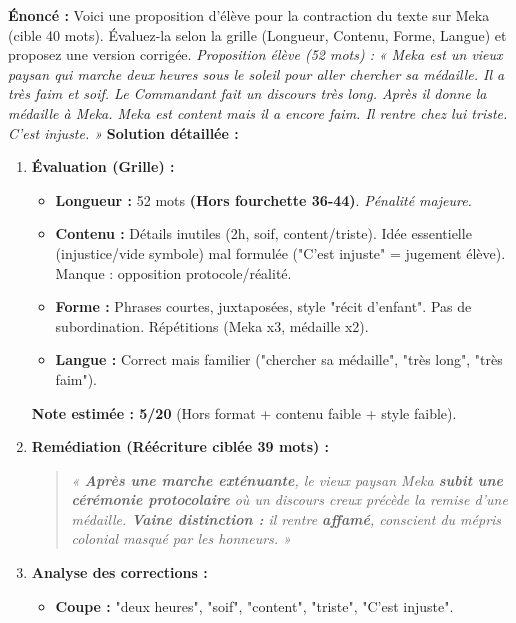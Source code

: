 \documentclass[11pt]{article}
\begin{document}
\begin{exoresolu}
    \textbf{Énoncé :} Voici une proposition d'élève pour la contraction du texte sur Meka (cible 40 mots). Évaluez-la selon la grille (Longueur, Contenu, Forme, Langue) et proposez une version corrigée.
    \textit{Proposition élève (52 mots) :}
    \textit{« Meka est un vieux paysan qui marche deux heures sous le soleil pour aller chercher sa médaille. Il a très faim et soif. Le Commandant fait un discours très long. Après il donne la médaille à Meka. Meka est content mais il a encore faim. Il rentre chez lui triste. C'est injuste. »}
    \tcblower
    \textbf{Solution détaillée :}
    \begin{enumerate}
        \item \textbf{Évaluation (Grille) :}
            \begin{itemize}
                \item \textbf{Longueur :} 52 mots \textbf{(Hors fourchette 36-44)}. \textit{Pénalité majeure.}
                \item \textbf{Contenu :} Détails inutiles (2h, soif, content/triste). Idée essentielle (injustice/vide symbole) mal formulée ("C'est injuste" = jugement élève). Manque : opposition protocole/réalité.
                \item \textbf{Forme :} Phrases courtes, juxtaposées, style "récit d'enfant". Pas de subordination. Répétitions (Meka x3, médaille x2).
                \item \textbf{Langue :} Correct mais familier ("chercher sa médaille", "très long", "très faim").
            \end{itemize}
            \textbf{Note estimée : 5/20} (Hors format + contenu faible + style faible).
        \item \textbf{Remédiation (Réécriture ciblée 39 mots) :}
            \begin{quote}
                \textit{« \textbf{Après une marche exténuante}, le vieux paysan Meka \textbf{subit une cérémonie protocolaire} où un discours creux précède la remise d'une médaille. \textbf{Vaine distinction :} il rentre \textbf{affamé}, conscient du mépris colonial masqué par les honneurs. »}
            \end{quote}
        \item \textbf{Analyse des corrections :}
            \begin{itemize}
                \item \textbf{Coupe :} "deux heures", "soif", "content", "triste", "C'est injuste".

\end{itemize}
\end{enumerate}
\end{exoresolu}
\end{document}
